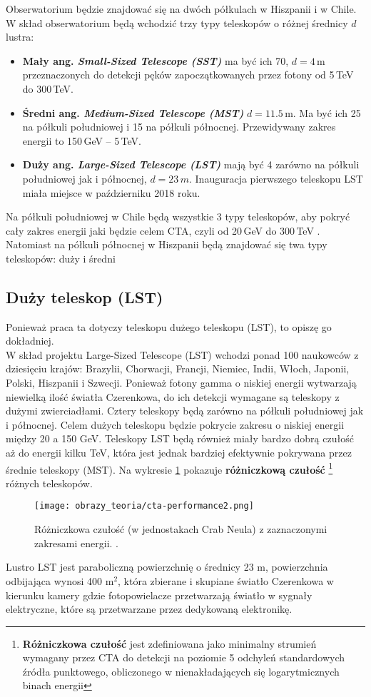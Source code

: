 \documentclass[a4paper,11pt,twoside]{article}
\begin{document}
Obserwatorium będzie znajdować się na dwóch półkulach w Hiszpanii i w Chile. W skład obserwatorium będą wchodzić trzy typy teleskopów o różnej średnicy $d$ lustra:
\begin{itemize}
\item {\bf{Mały} ang. \textsl{Small-Sized Telescope (SST)}} ma być ich 70, $d = 4$\,m przeznaczonych do detekcji pęków zapoczątkowanych przez fotony od 5\,TeV do 300\,TeV.
\item {\bf{Średni} ang. \textsl{Medium-Sized Telescope (MST)}} $d = 11.5$\,m. Ma być ich 25 na półkuli południowej i 15 na półkuli północnej. Przewidywany zakres energii to 150\,GeV -- 5\,TeV.
\item {\bf{Duży} ang. \textsl{Large-Sized Telescope (LST)}} mają być 4 zarówno na półkuli południowej jak i północnej, $d = 23\,m$. Inauguracja pierwszego teleskopu LST miała miejsce w październiku 2018 roku. 
\end{itemize}
Na półkuli południowej w Chile będą wszystkie 3 typy teleskopów,
 aby pokryć cały zakres energii jaki będzie celem CTA, czyli od 20\,GeV do 300\,TeV \cite{cta_web}. Natomiast na półkuli północnej w Hiszpanii będą znajdować się twa typy teleskopów: duży i średni  
\subsection{Duży teleskop (LST)}
Ponieważ praca ta dotyczy teleskopu dużego teleskopu (LST), to opiszę go dokładniej. \\
W skład projektu Large-Sized Telescope (LST) wchodzi ponad 100 naukowców z dziesięciu krajów: Brazylii, Chorwacji, Francji, Niemiec, Indii, Włoch, Japonii, Polski, Hiszpanii i Szwecji. Ponieważ fotony gamma o niskiej energii wytwarzają niewielką ilość światła Czerenkowa, do ich detekcji wymagane są teleskopy z dużymi zwierciadłami. Cztery teleskopy będą zarówno na półkuli południowej jak i północnej. Celem dużych teleskopu będzie pokrycie zakresu o niskiej energii między 20 a 150 GeV. Teleskopy LST będą również miały bardzo dobrą czułość aż do energii kilku TeV, która jest jednak bardziej efektywnie pokrywana przez średnie teleskopy (MST). Na wykresie \ref{fig:cta_perform} pokazuje {\bf{różniczkową czułość}} \footnote{ {\bf{Różniczkowa czułość}} jest zdefiniowana jako minimalny strumień wymagany przez CTA do detekcji na poziomie 5 odchyleń standardowych źródła punktowego, obliczonego w nienakładających się logarytmicznych binach energii} różnych teleskopów. 
\begin{figure}[H] 
\centering
\texttt{[image: obrazy\_teoria/cta-performance2.png]}
\caption{Różniczkowa czułość (w jednostakach Crab Neula) z zaznaczonymi zakresami energii. \cite{cta-perform}.}
\label{fig:cta_perform}
\end{figure}
Lustro LST jest paraboliczną powierzchnię o średnicy 23 m, powierzchnia odbijająca wynosi 400 m$^2$, która zbierane i skupiane światło Czerenkowa w kierunku kamery gdzie fotopowielacze przetwarzają światło w sygnały elektryczne, które są przetwarzane przez dedykowaną elektronikę.
\end{document}
